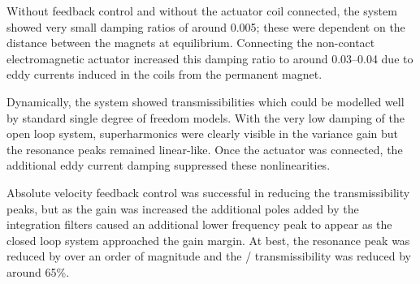 \documentclass[11pt,a4paper]{memoir}
\begin{document}
Without feedback control and without the actuator coil connected, the system showed very small damping ratios of around \num{0.005}; these were dependent on the distance between the magnets at equilibrium.
Connecting the non-contact electromagnetic actuator increased this damping ratio to around \num{0.03}--\num{0.04} due to eddy currents induced in the coils from the permanent magnet.

Dynamically, the system showed transmissibilities which could be modelled well by standard single degree of freedom models.
With the very low damping of the open loop system, superharmonics were clearly visible in the variance gain but the resonance peaks remained linear-like.
Once the actuator was connected, the additional eddy current damping suppressed these nonlinearities.

Absolute velocity feedback control was successful in reducing the transmissibility peaks, but as the gain was increased the additional poles added by the integration filters caused an additional lower frequency peak to appear as the closed loop system approached the gain margin.
At best, the resonance peak was reduced by over an order of magnitude and the \RMS/ transmissibility was reduced by around 65\%.
\end{document}
